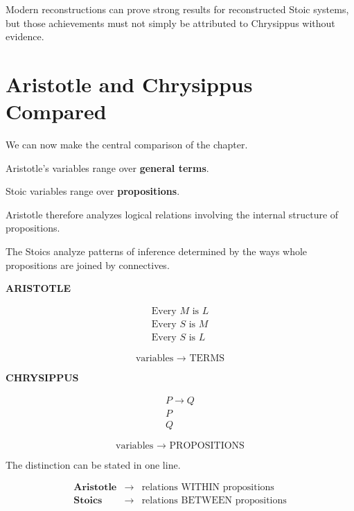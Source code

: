 \documentclass[11pt]{article}
\begin{document}
Modern reconstructions can prove strong results for reconstructed
Stoic systems, but those achievements must not simply be
attributed to Chrysippus without evidence.

\section{Aristotle and Chrysippus Compared}

We can now make the central comparison of the chapter.

Aristotle's variables range over \textbf{general terms}.

Stoic variables range over \textbf{propositions}.

Aristotle therefore analyzes logical relations involving the
internal structure of propositions.

The Stoics analyze patterns of inference determined by the ways
whole propositions are joined by connectives.

\begin{whiteboard}
\textbf{ARISTOTLE}

\[
\begin{array}{l}
\text{Every }M\text{ is }L\\
\text{Every }S\text{ is }M\\
\hline
\text{Every }S\text{ is }L
\end{array}
\]

\[
\boxed{\text{variables } \rightarrow \text{ TERMS}}
\]
\end{whiteboard}

\begin{whiteboard}
\textbf{CHRYSIPPUS}

\[
\begin{array}{c}
P\rightarrow Q\\
P\\
\hline
Q
\end{array}
\]

\[
\boxed{\text{variables } \rightarrow \text{ PROPOSITIONS}}
\]
\end{whiteboard}

The distinction can be stated in one line.

\begin{whiteboard}
\[
\begin{array}{rcl}
\textbf{Aristotle}
&\rightarrow&
\text{relations WITHIN propositions}
\\[0.6em]
\textbf{Stoics}
&\rightarrow&
\text{relations BETWEEN propositions}
\end{array}
\]
\end{whiteboard}
\end{document}
